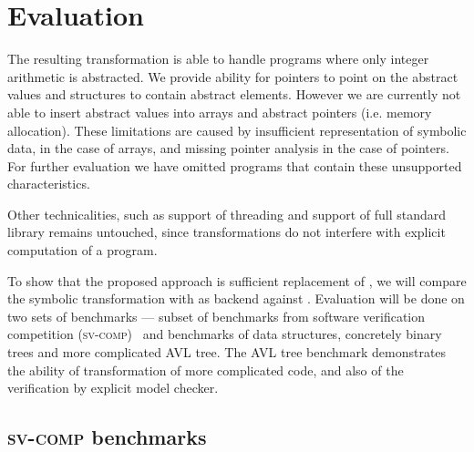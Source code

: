 \chapter{Evaluation}\label{ch:results}

The resulting transformation is able to handle programs where only integer
arithmetic is abstracted. We provide ability for pointers to point on the
abstract values and structures to contain abstract elements. However we are
currently not able to insert abstract values into arrays and abstract pointers
(i.e. memory allocation). These limitations are caused by insufficient
representation of symbolic data, in the case of arrays, and missing pointer
analysis in the case of pointers. For further evaluation we have omitted
programs that contain these unsupported characteristics.

Other technicalities, such as support of threading and support of full \Cpp{}
standard library remains untouched, since transformations do not interfere with
explicit computation of a program.

To show that the proposed approach is sufficient replacement of \SymDIVINE, we
will compare the symbolic transformation with \DIVINE as backend against \SymDIVINE.
Evaluation will be done on two sets of benchmarks --- subset of benchmarks from
software verification competition (\textsc{sv-comp})~\cite{Beyer17} and
benchmarks of data structures, concretely binary trees and more complicated AVL
tree. The AVL tree benchmark demonstrates the ability of transformation of more
complicated code, and also of the verification by explicit model checker.

\section{\textsc{sv-comp} benchmarks}

